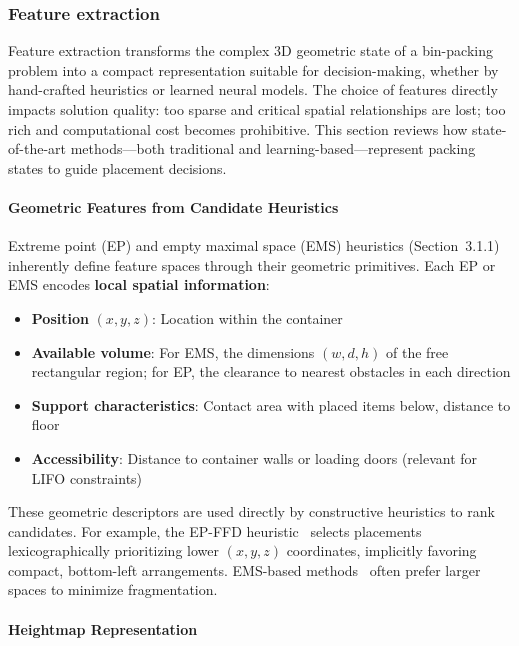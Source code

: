 
\subsubsection{Feature extraction}

Feature extraction transforms the complex 3D geometric state of a bin-packing problem into a compact representation suitable for decision-making, whether by hand-crafted heuristics or learned neural models. The choice of features directly impacts solution quality: too sparse and critical spatial relationships are lost; too rich and computational cost becomes prohibitive. This section reviews how state-of-the-art methods---both traditional and learning-based---represent packing states to guide placement decisions.

\paragraph{Geometric Features from Candidate Heuristics}

Extreme point (EP) and empty maximal space (EMS) heuristics (Section~3.1.1) inherently define feature spaces through their geometric primitives. Each EP or EMS encodes \textbf{local spatial information}:

\begin{itemize}
    \item \textbf{Position} $(x, y, z)$: Location within the container
    \item \textbf{Available volume}: For EMS, the dimensions $(w, d, h)$ of the free rectangular region; for EP, the clearance to nearest obstacles in each direction
    \item \textbf{Support characteristics}: Contact area with placed items below, distance to floor
    \item \textbf{Accessibility}: Distance to container walls or loading doors (relevant for LIFO constraints)
\end{itemize}

These geometric descriptors are used directly by constructive heuristics to rank candidates. For example, the EP-FFD heuristic~\cite{CPT08} selects placements lexicographically prioritizing lower $(x, y, z)$ coordinates, implicitly favoring compact, bottom-left arrangements. EMS-based methods~\cite{PAVTO08, GR13} often prefer larger spaces to minimize fragmentation.


\paragraph{Heightmap Representation}

